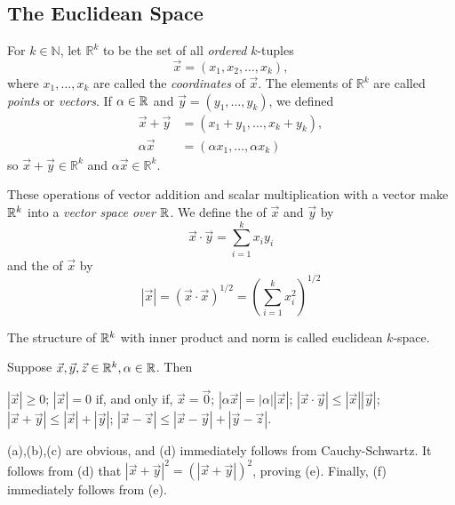 \documentclass{article}
\begin{document}
\subsection{The Euclidean Space}
\begin{definition}
    For $k\in\mathbb{N}$, let $\mathbb{R}^{k}$ to be the set of all \textit{ordered} $k$-tuples \[\vec{x}=(x_{1},x_{2},\dotsc,x_{k}),\]where $x_{1},\dotsc,x_{k}$ are called the \emph{coordinates} of $\vec{x}$. The elements of $\mathbb{R}^{k}$ are called \emph{points} or \textit{vectors}. If $\alpha\in\mathbb R$ and $\vec{y}=(y_{1},\dotsc,y_{k})$, we defined \begin{align*}
        \vec{x}+\vec{y} & = (x_{1}+y_{1},\dotsc,x_{k}+y_{k}),\\
        \alpha\vec{x} & =(\alpha x_{1},\dotsc,\alpha x_{k})
    \end{align*}so $\vec{x}+\vec{y}\in\mathbb{R}^{k}$ and $\alpha \vec{x}\in\mathbb{R}^{k}$.

    These operations of vector addition and scalar multiplication with a vector make $\mathbb R^{k}$ into a \emph{vector space over $\mathbb R$}. We define the  of $\vec{x}$ and $\vec{y}$ by \[\vec{x}\cdot\vec{y}=\sum_{i=1}^{k}x_{i}y_{i}\]and the  of $\vec{x}$ by \[|\vec{x}|=(\vec{x}\cdot \vec{x})^{1/2}=\left(\sum_{i=1}^{k}x_{i}^{2}\right)^{1/2}\]

    The structure of $\mathbb R^{k}$ with inner product and norm is called euclidean $k$-space.
\end{definition}
\begin{theorem}
    Suppose $\vec{x},\vec{y},\vec{z}\in\mathbb R^{k},\alpha\in\mathbb R$. Then \begin{enumerate}
        \ii $|\vec{x}|\geq 0$;
        \ii $|\vec{x}|=0$ if, and only if, $\vec{x}=\vec{0}$;
        \ii $|\alpha\vec{x}|=|\alpha||\vec{x}|$;
        \ii $|\vec{x}\cdot \vec{y}|\leq |\vec{x}||\vec{y}|$;
        \ii $|\vec{x}+\vec{y}|\leq |\vec{x}|+|\vec{y}|$;
        \ii $|\vec{x}-\vec{z}|\leq |\vec{x}-\vec{y}|+|\vec{y}-\vec{z}|$.
    \end{enumerate}
\end{theorem}
\begin{remark}
    (a),(b),(c) are obvious, and (d) immediately follows from Cauchy-Schwartz. It follows from (d) that $|\vec{x}+\vec{y}|^{2}=(|\vec{x}+\vec{y}|)^{2}$, proving (e). Finally, (f) immediately follows from (e).
\end{remark}



\newpage
\end{document}
